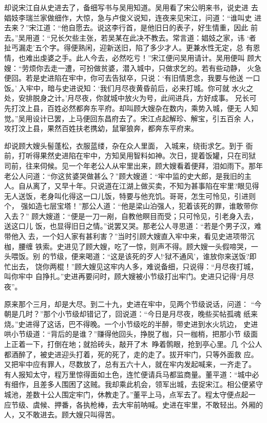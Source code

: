 却说宋江自从史进去了，备细写书与吴用知道。吴用看了宋公明来书，说史进
去娼妓李瑞兰家做细作，大惊，急与卢俊义说知，连夜来见宋江，问道：“谁叫史
进去来？”宋江道：“他自愿去。说这李行首，是他旧日的表子，好生情重，因此
前去。”吴用道：“兄长欠些主张，若吴某在此决不教去。常言道：娼妓之家，讳
‘者扯丐漏走’五个字。得便熟闲，迎新送旧，陷了多少才人。更兼水性无定，总
有恩情，也难出虔婆之手。此人今去，必然吃亏！”宋江便问吴用请计。吴用便叫
顾大嫂：“劳烦你去走一遭，可扮做贫婆，潜入城中，只做求乞的。若有些动静，
火急便回。若是史进陷在牢中，你可去告狱卒，只说：‘有旧情恩念，我要与他送
一口饭。’入牢中，暗与史进说知：‘我们月尽夜黄昏前后，必来打城。你可就
水火之处，安排脱身之计。’月尽夜，你就城中放火为号，此间进兵，方好成事。
兄长可先打汶上县，百姓必然都奔东平府。却叫顾大嫂杂在数内，乘势入城，便无
人知觉。”吴用设计已罢，上马便回东昌府去了。宋江点起解珍、解宝，引五百余
人，攻打汶上县，果然百姓扶老携幼，鼠窜狼奔，都奔东平府来。

却说顾大嫂头髻蓬松，衣服蓝缕，杂在众人里面，入城来，绕街求乞。到于
衙前，打听得果然史进陷在牢中，方知吴用智料如神。次日，提着饭罐，只在司狱
司前，往来伺候。见一个年老公人从牢里出来，顾大嫂看着便拜，泪如雨下。那年
老公人问道：“你这贫婆哭做甚么？”顾大嫂道：“牢中监的史大郎，是我旧的主
人。自从离了，又早十年。只说道在江湖上做买卖，不知为甚事陷在牢里?眼见得
无人送饭，老身叫化得这一口儿饭，特要与他充饥。哥哥，怎生可怜见，引进则个，
强如造七层宝塔！”那公人道：“他是梁山泊强人，犯着该死的罪，谁敢带你入去？”
顾大嫂道：“便是一刀一剐，自教他瞑目而受；只可怜见，引老身入去，送这口儿
饭，也显得旧日之情。”说罢又哭。那老公人寻思道：“若是个男子汉，难带他入
去，一个妇人家有甚利害？”当时引顾大嫂直入牢中来，看见史进项带沉枷，腰缠
铁索。史进见了顾大嫂，吃了一惊，则声不得。顾大嫂一头假啼哭，一头喂饭。别
的节级，便来喝道：“这是该死的歹人!‘狱不通风’，谁放你来送饭?即忙出去，
饶你两棍！”顾大嫂见这牢内人多，难说备细，只说得：“月尽夜打城，叫你牢中
自挣扎。”史进再要问时，顾大嫂被小节级打出牢门。史进只记得“月尽夜”。

原来那个三月，却是大尽。到二十九，史进在牢中，见两个节级说话，问道：
“今朝是几时？”那个小节级却错记了，回说道：“今日是月尽夜，晚些买帖孤魂
纸来烧。”史进得了这话，巴不得晚。一个小节级吃的半醉，带史进到水火坑边，
史进哄小节级道：“背后的是谁？”赚得他回头，挣脱了枷，只一枷梢，把那小节
级面上正着一下，打倒在地；就拾砖头，敲开了木，睁着鹘眼，抢到亭心里。几
个公人都酒醉了，被史进迎头打着，死的死了，走的走了。拔开牢门，只等外面救
应。又把牢中应有罪人，尽数放了，总有五六十人，就在牢内发起喊来，一齐走了。
有人报知太守，程万里惊得面如土色，连忙便请兵马都监商量。董平道：“城中必
有细作，且差多人围困了这贼。我却乘此机会，领军出城，去捉宋江。相公便紧守
城池，差数十公人围定牢门，休教走了。”董平上马，点军去了。程太守便点起一
应节级、虞候、押番，各执枪棒，去大牢前呐喊。史进在牢里，不敢轻出。外厢的
人，又不敢进去。顾大嫂只叫得苦。

